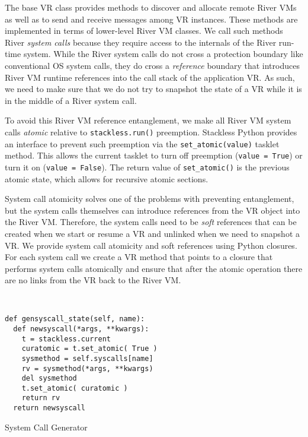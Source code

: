 The base VR class provides methods to discover and allocate remote River VMs as well as to send and receive messages among VR instances.  These methods are implemented in terms of lower-level River VM classes.  We call such methods River {\it system calls} because they require access to the internals of the River run-time system.   While the River system calls do not cross a protection boundary like conventional OS system calls, they do cross a  {\it reference} boundary that introduces River VM runtime references into the call stack of the application VR.  As such, we need to make sure that we do not try to snapshot the state of a VR while it is in the middle of a River system call.

To avoid this River VM reference entanglement, we make all River VM system calls {\it atomic} relative to \verb+stackless.run()+ preemption.
Stackless Python provides an interface to prevent such preemption via the \verb+set_atomic(value)+ tasklet method.  This allows the current tasklet to turn off preemption (\verb+value = True+) or turn it on (\verb+value = False+).  The return value of \verb+set_atomic()+ is the previous atomic state, which allows for recursive atomic sections.

System call atomicity solves one of the problems with preventing
entanglement, but the system calls themselves can introduce references from
the VR object into the River VM.  Therefore, the system calls need to be
{\it soft} references that can be created when we start or resume a VR and
unlinked when we need to snapshot a VR.  We provide system call atomicity
and soft references using Python closures.  For each system call we create
a VR method that points to a closure that performs system calls atomically and ensure that after the atomic operation there are no links from the VR back to the River VM.  

\begin{listing}
\scriptsize
\begin{verbatim}


def gensyscall_state(self, name):
  def newsyscall(*args, **kwargs):
    t = stackless.current
    curatomic = t.set_atomic( True )
    sysmethod = self.syscalls[name]
    rv = sysmethod(*args, **kwargs)
    del sysmethod
    t.set_atomic( curatomic )
    return rv
  return newsyscall
\end{verbatim}
\normalsize
\caption{System Call Generator}
\label{ex:systemcallgenerator}
\end{listing}

